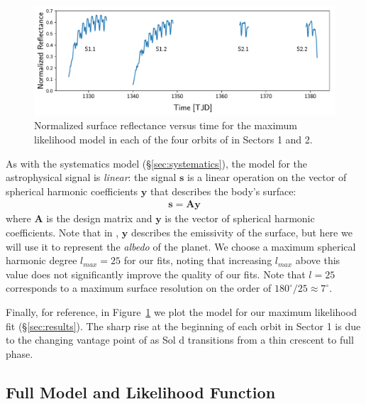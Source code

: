 \documentclass[modern]{aastex62}
\begin{document}
\begin{figure}[ht!]
    \begin{centering}
    \includegraphics[width=\linewidth]{figures/starry_model.pdf}
    \caption{\label{fig:starry_model}
             Normalized surface reflectance versus time for the maximum
             likelihood \starry model in each of the four orbits of \tess
             in Sectors 1 and 2.
             }
    \end{centering}
\end{figure}

As with the systematics model (\S\ref{sec:systematics}), the model
for the astrophysical signal is \emph{linear}: the signal $\mathbf{s}$ 
is a linear operation on the vector of spherical harmonic coefficients 
$\mathbf{y}$
that describes the body's surface:
%
\begin{align}
    \mathbf{s} = \mathbf{A} \mathbf{y}
\end{align}
%
where $\mathbf{A}$ is the design matrix and $\mathbf{y}$ is the vector of spherical harmonic coefficients. 
Note that in \cite{Luger2019}, $\mathbf{y}$ describes the emissivity of the surface,
but here we will use it to represent the \emph{albedo} of the planet.
We choose a maximum spherical harmonic degree $l_{max} = 25$ for our fits,
noting that increasing $l_{max}$ above this value does not significantly
improve the quality of our fits. Note that $l = 25$ corresponds to
a maximum surface resolution on the order of $180^\circ/25 \approx 7^\circ$.

Finally, for reference, in Figure~\ref{fig:starry_model} we plot the
\starry model for our maximum likelihood fit (\S\ref{sec:results}). The
sharp rise at the beginning of each orbit in Sector 1 is due to the changing
vantage point of \tess as Sol d transitions from a thin crescent to full phase.

\subsection{Full Model and Likelihood Function}
\label{sec:model}
\end{document}
